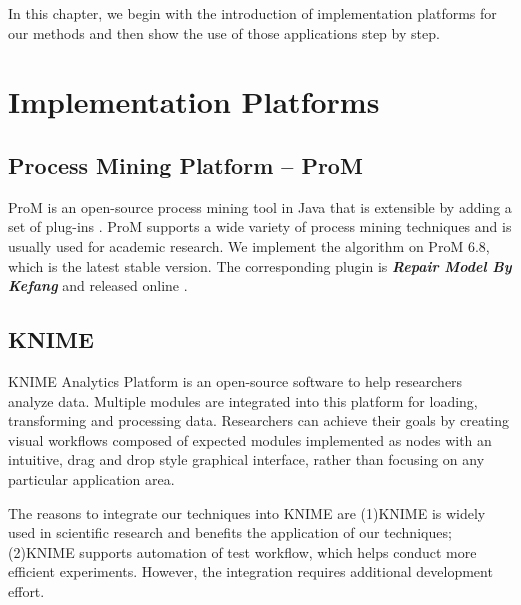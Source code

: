 In this chapter, we begin with the introduction of implementation platforms for our methods and then show the use of those applications step by step.

\section{Implementation Platforms}
\subsection{Process Mining Platform -- ProM}
ProM is an open-source process mining tool in Java that is extensible by adding a set of plug-ins \cite{ProM}. ProM supports a wide variety of process mining techniques and is usually used for academic research. We implement the algorithm on ProM 6.8, which is the latest stable version. The corresponding plugin is \textbf{\emph{Repair Model By Kefang}} and released online \cite{MyPlugin}.

\subsection{KNIME}
KNIME Analytics Platform is an open-source software to help researchers analyze data. Multiple modules are integrated into this platform for loading, transforming and processing data. Researchers can achieve their goals by creating visual workflows composed of expected modules implemented as nodes with an intuitive, drag and drop style graphical interface, rather than focusing on any particular application area.

The reasons to integrate our techniques into KNIME are (1)KNIME is widely used in scientific research and benefits the application of our techniques;(2)KNIME supports automation of test workflow, which helps conduct more efficient experiments.  However, the integration requires additional development effort.
